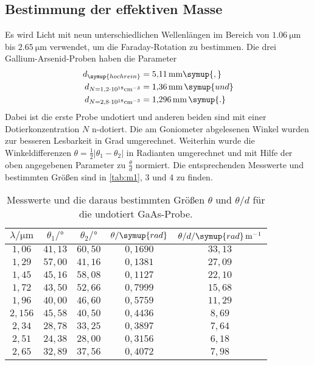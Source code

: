 \subsection{Bestimmung der effektiven Masse}
Es wird Licht mit neun unterschiedlichen Wellenlängen im Bereich von $\SI{1,06}{\micro\meter}$ bis
$\SI{2,65}{\micro\meter}$ verwendet, um die Faraday-Rotation zu bestimmen. Die drei Gallium-Arsenid-Proben haben
die Parameter
\begin{align*}
  d_{\symup{hochrein}} &= \SI{5,11}{\milli\meter}\symup{,} \\
  d_{N=1,2 \cdot 10^{18} \si{cm}^{-3}} &= \SI{1,36}{\milli\meter}\,\symup{ und} \\
  d_{N=2,8 \cdot 10^{18} \si{cm}^{-3}} &= \SI{1,296}{\milli\meter}\,\symup{.}
\end{align*}
Dabei ist die erste Probe undotiert und anderen beiden sind mit einer Dotierkonzentration $N$ n-dotiert.
Die am Goniometer abgelesenen Winkel wurden zur besseren Lesbarkeit in Grad umgerechnet. Weiterhin wurde die
Winkeldifferenzen $\theta = \frac{1}{2}|\theta_{1} - \theta_{2}|$ in Radianten umgerechnet und mit Hilfe
der oben angegebenen Parameter zu $\frac{\theta}{d}$ normiert.
Die entsprechenden Messwerte und bestimmten Größen sind in \autoref{tab:m1}, 3 und 4 zu finden.
\begin{table}[hbt!]
  \centering
  \caption{Messwerte und die daraus bestimmten Größen $\theta$ und $\theta/d$ für die undotiert GaAs-Probe.}
  \label{tab:m1}
  \begin{tabular}{c c c c c}
    \toprule
    $\lambda/\si{\micro\meter}$ & $\theta_{1}/\si{\degree}$ & $\theta_{2}/\si{\degree}$ & $\theta/\symup{rad}$ & $\theta/d/\symup{rad}\, \si{m}^{-1}$\\
    \midrule
    $1,06 $ & $41,13$ & $60,50$ & $0,1690$ & $33,13$ \\
    $1,29 $ & $57,00$ & $41,16$ & $0,1381$ & $27,09$ \\
    $1,45 $ & $45,16$ & $58,08$ & $0,1127$ & $22,10$ \\
    $1,72 $ & $43,50$ & $52,66$ & $0,7999$ & $15,68$ \\
    $1,96 $ & $40,00$ & $46,60$ & $0,5759$ & $11,29$ \\
    $2,156$ & $45,58$ & $40,50$ & $0,4436$ & $ 8,69$ \\
    $2,34 $ & $28,78$ & $33,25$ & $0,3897$ & $ 7,64$ \\
    $2,51 $ & $24,38$ & $28,00$ & $0,3156$ & $ 6,18$ \\
    $2,65 $ & $32,89$ & $37,56$ & $0,4072$ & $ 7,98$ \\
    \bottomrule
  \end{tabular}
\end{table}

